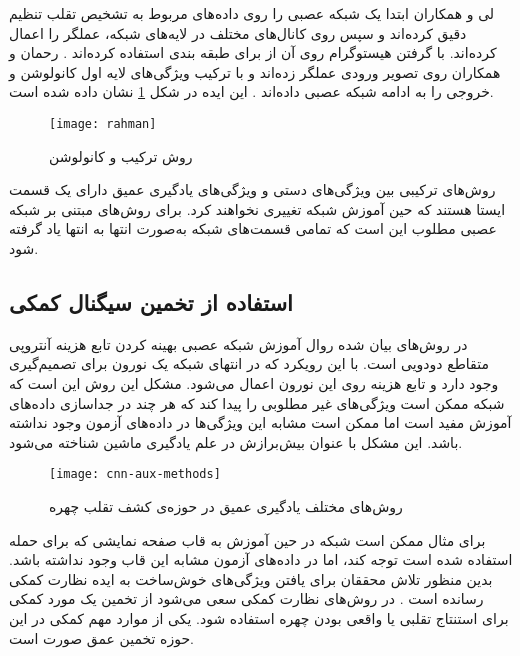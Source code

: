 لی و همکاران ابتدا یک شبکه عصبی
را روی داده‌های مربوط به تشخیص تقلب تنظیم دقیق کرده‌اند و سپس روی کانال‌های مختلف در لایه‌های شبکه، عملگر  را اعمال کرده‌اند. با گرفتن هیستوگرام روی آن از  برای طبقه بندی استفاده کرده‌اند
\cite{li2019face}.
رحمان و همکاران روی تصویر ورودی عملگر  زده‌اند و با ترکیب ویژگی‌های لایه اول کانولوشن و خروجی  را به ادامه شبکه عصبی داده‌اند
\cite{rehman2020enhancing}. 
 این ایده در شکل
\ref{fig:rahman}
نشان داده شده است.
\begin{figure}[!h]
	\centerline{\texttt{[image: rahman]}}
	\caption{روش ترکیب  و کانولوشن \cite{rehman2020enhancing}}
	\label{fig:rahman}
\end{figure}

روش‌های ترکیبی بین ویژگی‌های دستی و ویژگی‌های یادگیری عمیق دارای یک قسمت ایستا هستند که حین آموزش شبکه تغییری نخواهند کرد. برای روش‌های مبتنی بر شبکه عصبی مطلوب این است که تمامی قسمت‌های شبکه به‌صورت انتها به انتها یاد گرفته شود.


\subsection{استفاده از تخمین سیگنال کمکی}
در روش‌های بیان شده روال آموزش شبکه عصبی بهینه کردن تابع هزینه آنتروپی متقاطع دودویی
 است. با این رویکرد که در انتهای شبکه یک نورون برای تصمیم‌گیری وجود دارد و تابع هزینه روی این نورون اعمال می‌شود. مشکل این روش این است که شبکه ممکن است ویژگی‌های غیر مطلوبی را پیدا کند که هر چند در جداسازی داده‌های آموزش مفید است اما ممکن است مشابه این ویژگی‌ها در داده‌های آزمون وجود نداشته باشد. این مشکل با عنوان بیش‌برازش
  در علم یادگیری ماشین شناخته می‌شود.

\begin{figure}[h]
	\centerline{\texttt{[image: cnn-aux-methods]}}
	\caption{روش‌های مختلف یادگیری عمیق در حوزه‌ی کشف تقلب چهره \cite{yu2021deep}}
	\label{fig:cnn-aux-methods}
\end{figure}

برای مثال ممکن است شبکه در حین آموزش به قاب صفحه نمایشی که برای حمله استفاده شده است توجه کند، اما در داده‌های آزمون مشابه این قاب وجود نداشته باشد. بدین منظور تلاش محققان برای یافتن ویژگی‌های خوش‌ساخت
 به ایده نظارت کمکی
  رسانده است
\cite{liu2018learning}.  
در روش‌های نظارت کمکی سعی می‌شود از تخمین یک مورد کمکی برای استنتاج تقلبی یا واقعی بودن چهره استفاده شود. یکی از موارد مهم کمکی در این حوزه تخمین عمق صورت است.


